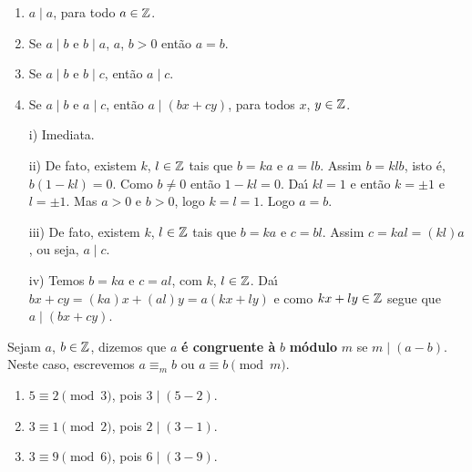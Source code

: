 \documentclass{beamer}
\begin{document}
    \begin{frame}
        \begin{proposicao}
            \begin{enumerate}[label={\roman*})]
                \item $a\mid a$, para todo $a \in \mathbb{Z}$.
                \item Se $a\mid b$ e $b\mid a$, $a$, $b > 0$ ent\~ao $a = b$.
                \item Se $a\mid b$ e $b\mid c$, ent{\~a}o $a\mid c$.
                \item Se $a\mid b$ e $a\mid c$, ent{\~a}o $a\mid (bx+cy)$, para todos $x$, $y \in \mathbb{Z}$.
            \end{enumerate}
        \end{proposicao}
        \begin{enumerate}
            \item[i)] Imediata.
            
            \item[ii)] De fato, existem $k$, $l \in \mathbb{Z} $ tais que $b = ka$ e $a = lb$. Assim $b = klb$, isto \'e, $b(1 - kl) = 0$.
            Como $b \ne 0$ ent\~ao $1 - kl = 0$. Da{\'\i} $kl = 1$ e ent\~ao $k = \pm 1$ e $l = \pm 1$. Mas $a > 0$ e $b > 0$, logo $k = l =1$. Logo $a = b$.

            \item[iii)] De fato, existem $k$, $l \in \mathbb{Z}$ tais que $b = ka$ e $c = bl$. Assim  $c = kal = (kl)a$, ou seja, $a\mid c$.
        \end{enumerate}
    \end{frame}
    \begin{frame}
        \begin{enumerate}
            \item[iv)] Temos $b = ka$ e $c = al$, com $k$, $l \in \mathbb{Z}$. Da{\'\i} $bx + cy = (ka)x + (al)y = a(kx + ly)$ e como $kx + ly \in \mathbb{Z}$ segue que $a \mid (bx + cy)$.
        \end{enumerate}

        \begin{definicao}
            Sejam $a$, $b \in\mathbb{Z}$, dizemos que $a$ \textbf{{\'e} congruente \`a} $b$ \textbf{m{\'o}dulo} $m$ se $m \mid (a-b)$. Neste caso, escrevemos $a\equiv_{m} b$ ou $a\equiv b \pmod{m}$.
        \end{definicao}

        \begin{exemplos}
            \begin{enumerate}[label={\arabic*})]
                \item $5\equiv 2 \pmod{3}$, pois $3 \mid (5-2)$.
                \item $3\equiv 1 \pmod{2}$, pois $2\mid (3-1)$.
                \item $3\equiv 9 \pmod{6}$, pois $6\mid (3-9)$.
            \end{enumerate} 
        \end{exemplos}
    \end{frame}
\end{document}
